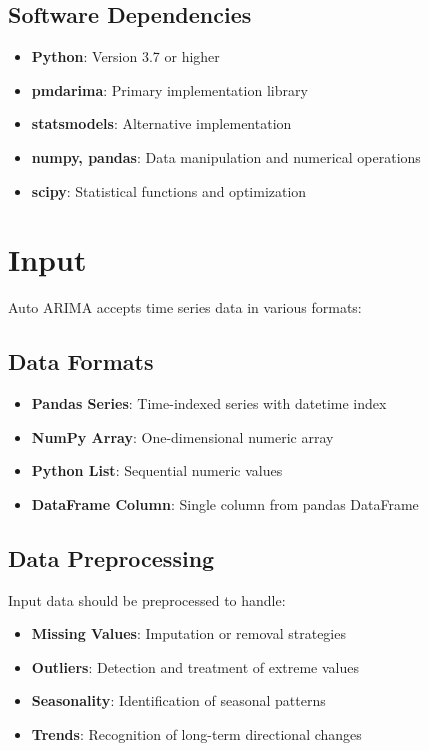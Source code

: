 \subsection{Software Dependencies}
\begin{itemize}
	\item \textbf{Python}: Version 3.7 or higher
	\item \textbf{pmdarima}: Primary implementation library
	\item \textbf{statsmodels}: Alternative implementation
	\item \textbf{numpy, pandas}: Data manipulation and numerical operations
	\item \textbf{scipy}: Statistical functions and optimization
\end{itemize}

\section{Input}
\label{sec:input}

Auto ARIMA accepts time series data in various formats:

\subsection{Data Formats}
\begin{itemize}
	\item \textbf{Pandas Series}: Time-indexed series with datetime index
	\item \textbf{NumPy Array}: One-dimensional numeric array
	\item \textbf{Python List}: Sequential numeric values
	\item \textbf{DataFrame Column}: Single column from pandas DataFrame
\end{itemize}

\subsection{Data Preprocessing}
Input data should be preprocessed to handle:
\begin{itemize}
	\item \textbf{Missing Values}: Imputation or removal strategies
	\item \textbf{Outliers}: Detection and treatment of extreme values
	\item \textbf{Seasonality}: Identification of seasonal patterns
	\item \textbf{Trends}: Recognition of long-term directional changes
\end{itemize}

